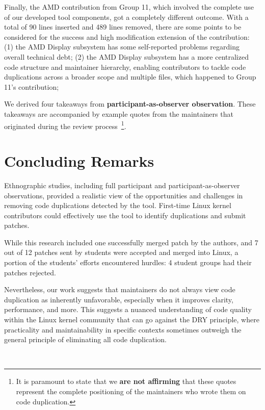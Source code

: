 \documentclass[sigconf]{acmart}
\begin{document}
Finally, the AMD contribution from Group 11, which involved the complete use of our developed tool components, got a completely different outcome. With a total of 90 lines inserted and 489 lines removed, there are some points to be considered for the success and high modification extension of the contribution: (1) the AMD Display subsystem has some self-reported problems regarding overall technical debt; (2) the AMD Display subsystem has a more centralized code structure and maintainer hierarchy, enabling contributors to tackle code duplications across a broader scope and multiple files, which happened to Group 11's contribution;

We derived four takeaways from \textbf{participant-as-observer observation}. These takeaways are accompanied by example quotes from the maintainers that originated during the review process~\footnote{It is paramount to state that we \textbf{are not affirming} that these quotes represent the complete positioning of the maintainers who wrote them on code duplication.}.


\section{Concluding Remarks}

Ethnographic studies, including full participant and participant-as-observer observations, provided a realistic view of the opportunities and challenges in removing code duplications detected by the tool. First-time Linux kernel contributors could effectively use the tool to identify duplications and submit patches.

While this research included one successfully merged patch by the authors, and 7 out of 12 patches sent by students were accepted and merged into Linux, a portion of the students' efforts encountered hurdles: 4 student groups had their patches rejected.

Nevertheless, our work suggests that maintainers do not always view code duplication as inherently unfavorable, especially when it improves clarity, performance, and more. This suggests a nuanced understanding of code quality within the Linux kernel community that can go against the DRY principle, where practicality and maintainability in specific contexts sometimes outweigh the general principle of eliminating all code duplication.

\hfill\\
\end{document}

